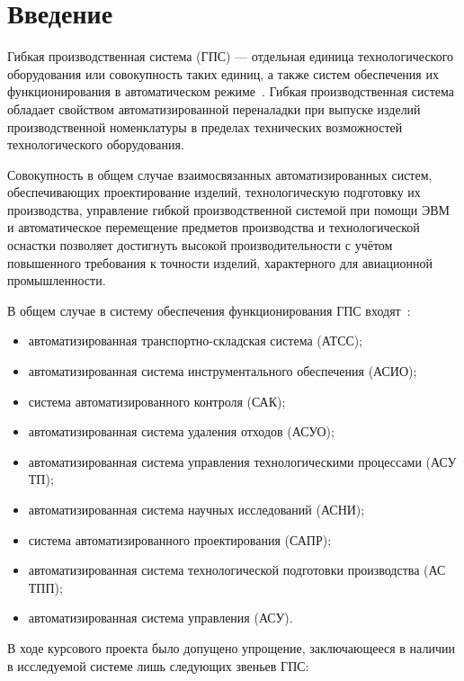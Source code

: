 \section*{Введение}

Гибкая производственная система (ГПС) --- отдельная единица технологического оборудования или совокупность таких единиц, а также систем обеспечения их функционирования в автоматическом режиме~\cite{robotcomplex}. Гибкая производственная система обладает свойством автоматизированной переналадки при выпуске изделий производственной номенклатуры в пределах технических возможностей технологического оборудования.

Совокупность в общем случае взаимосвязанных автоматизированных систем, обеспечивающих проектирование изделий, технологическую подготовку их производства, управление гибкой производственной системой при помощи ЭВМ и автоматическое перемещение предметов производства и технологической оснастки позволяет достигнуть высокой производительности с учётом повышенного требования к точности изделий, характерного для авиационной промышленности.

В общем случае в систему обеспечения функционирования ГПС входят~\cite{novich:methodic}:

\begin{itemize}
    \item автоматизированная транспортно-складская система (АТСС);
    \item автоматизированная система инструментального обеспечения (АСИО);
    \item система автоматизированного контроля (САК);
    \item автоматизированная система удаления отходов (АСУО);
    \item автоматизированная система управления технологическими процессами (АСУ ТП);
    \item автоматизированная система научных исследований (АСНИ);
    \item система автоматизированного проектирования (САПР);
    \item автоматизированная система технологической подготовки производства (АС ТПП);
    \item автоматизированная система управления (АСУ).
\end{itemize}

В ходе курсового проекта было допущено упрощение, заключающееся в наличии в исследуемой системе лишь следующих звеньев ГПС:


